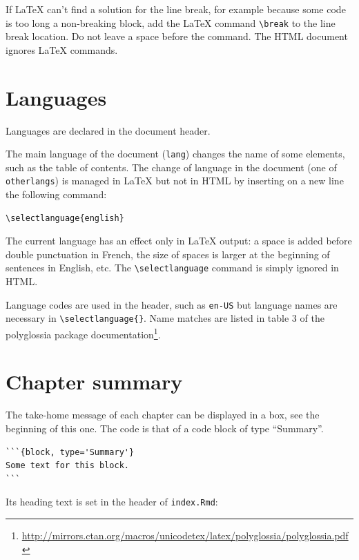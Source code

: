 \documentclass[
  12pt,
  american,
  a4paper,
  extrafontsizes,onecolumn,openright
  ]{memoir}
\begin{document}
If LaTeX can't find a solution for the line break, for example because some code is too long a non-breaking block, add the LaTeX command \texttt{\textbackslash{}break} to the line break location.
Do not leave a space before the command.
The HTML document ignores LaTeX commands.

\hypertarget{sec:languages}{%
\section{Languages}\label{sec:languages}}

Languages are declared in the document header.

The main language of the document (\texttt{lang}) changes the name of some elements, such as the table of contents.
The change of language in the document (one of \texttt{otherlangs}) is managed in LaTeX but not in HTML by inserting on a new line the following command:

\begin{verbatim}
\selectlanguage{english}
\end{verbatim}

The current language has an effect only in LaTeX output: a space is added before double punctuation in French, the size of spaces is larger at the beginning of sentences in English, etc.
The \texttt{\textbackslash{}selectlanguage} command is simply ignored in HTML.

Language codes are used in the header, such as \texttt{en-US} but language names are necessary in \texttt{\textbackslash{}selectlanguage\{\}}.
Name matches are listed in table 3 of the polyglossia package documentation\footnote{\url{http://mirrors.ctan.org/macros/unicodetex/latex/polyglossia/polyglossia.pdf}}.

\hypertarget{chapter-summary}{%
\section{Chapter summary}\label{chapter-summary}}

The take-home message of each chapter can be displayed in a box, see the beginning of this one.
The code is that of a code block of type ``Summary''.

\begin{verbatim}
```{block, type='Summary'}
Some text for this block.
```
\end{verbatim}

Its heading text is set in the header of \texttt{index.Rmd}:
\end{document}
